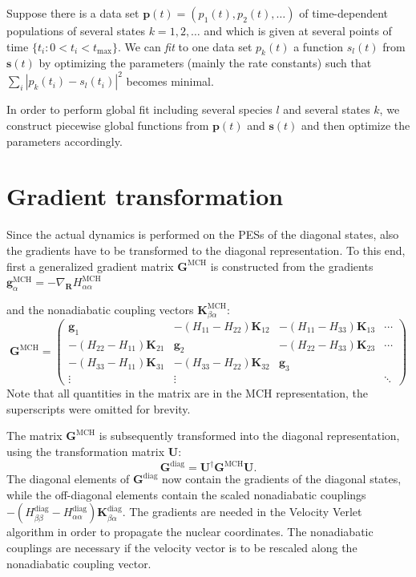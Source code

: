\documentclass[a4paper,10pt,DIV=15,openany]{scrbook}
\newcommand{\tthdump}[1]{#1}
\newcommand{\VEC}[1]{\ensuremath{\mathbf{#1}}}
\begin{document}
Suppose there is a data set $\VEC{p}(t)=(p_1(t),p_2(t),\dots)$ of time-dependent populations of several states $k=1,2,\dots$ and which is given at several points of time $\{t_i: 0<t_i<t_\mathrm{max}\}$.
We can \textit{fit} to one data set $p_k(t)$ a function $s_l(t)$ from $\VEC{s}(t)$ by optimizing the parameters (mainly the rate constants) such that $\sum_i |p_k(t_i)-s_l(t_i)|^2$ becomes minimal.

In order to perform global fit including several species $l$ and several states $k$, we construct piecewise global functions from $\VEC{p}(t)$ and $\VEC{s}(t)$ and then optimize the parameters accordingly.





\section{Gradient transformation}\label{met:gradtra}

Since the actual dynamics is performed on the PESs of the diagonal states, also the gradients have to be transformed to the diagonal representation. To this end, first a generalized gradient matrix $\VEC{G}^{\text{MCH}}$ is constructed from the gradients %
\tthdump{%
$\VEC{g}^{\text{MCH}}_\alpha=-\nabla_\VEC{R}H_{\alpha\alpha}^{\text{MCH}}$%
}
and the nonadiabatic coupling vectors 
$\VEC{K}_{\beta\alpha}^{\text{MCH}}$:
\begin{equation}
  \VEC{G}^{\text{MCH}}=
  \begin{pmatrix}
    \VEC{g}_1   &-(H_{11}-H_{22})\VEC{K}_{12} &-(H_{11}-H_{33})\VEC{K}_{13} &\cdots\\
    -(H_{22}-H_{11})\VEC{K}_{21}      &\VEC{g}_2      &-(H_{22}-H_{33})\VEC{K}_{23}&\cdots\\
    -(H_{33}-H_{11})\VEC{K}_{31}      &-(H_{33}-H_{22})\VEC{K}_{32} &\VEC{g}_3\\
    \vdots      &\vdots         &       &\ddots
  \end{pmatrix}
\end{equation}
Note that all quantities in the matrix are in the MCH representation, the superscripts were omitted for brevity.

The matrix $\VEC{G}^{\text{MCH}}$ is subsequently transformed into the diagonal representation, using the transformation matrix $\VEC{U}$:
\begin{equation}
  \VEC{G}^{\text{diag}}=\VEC{U}^\dagger\VEC{G}^{\text{MCH}}\VEC{U}.
\end{equation}
The diagonal elements of $\VEC{G}^{\text{diag}}$ now contain the gradients of the diagonal states, while the off-diagonal elements contain the scaled nonadiabatic couplings $-(H^{\text{diag}}_{\beta\beta}-H^{\text{diag}}_{\alpha\alpha})\VEC{K}_{\beta\alpha}^{\text{diag}}$. The gradients are needed in the Velocity Verlet algorithm in order to propagate the nuclear coordinates. The nonadiabatic couplings are necessary if the velocity vector is to be rescaled along the nonadiabatic coupling vector.
\end{document}
